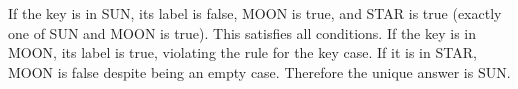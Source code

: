 If the key is in SUN, its label is false, MOON is true, and STAR is true (exactly one of SUN and MOON is true). This satisfies all conditions. If the key is in MOON, its label is true, violating the rule for the key case. If it is in STAR, MOON is false despite being an empty case. Therefore the unique answer is $\boxed{\text{SUN}}$.
